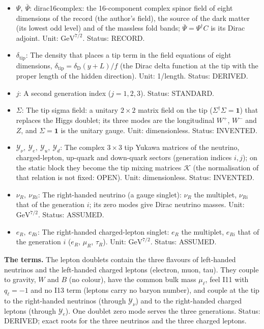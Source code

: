 \documentclass[
  10pt,
]{article}
\begin{document}
\begin{itemize}
  \(\psi\) (\(q_Q = q_{u_R} = q_{d_R} = \frac13\),
  \(q_\ell = q_{e_R} = q_{\nu_R} = -1\)), \(q_f\) of the fermion
  component \(f\). Unit: dimensionless. Status: STANDARD.
\item
  \(\Psi,\ \bar\Psi\): dirac16complex: the 16-component complex spinor
  field of eight dimensions of the record (the author's field), the
  source of the dark matter (its lowest odd level) and of the massless
  fold bands; \(\bar\Psi = \Psi^\dagger C\) is its Dirac adjoint. Unit:
  \(\mathrm{GeV}^{7/2}\). Status: RECORD.
\item
  \(\delta_{\mathrm{tip}}\): The density that places a tip term in the
  field equations of eight dimensions,
  \(\delta_{\mathrm{tip}} = \delta_{\mathrm{D}}(y + L)/f\) (the Dirac
  delta function at the tip with the proper length of the hidden
  direction). Unit: 1/length. Status: DERIVED.
\item
  \(j\): A second generation index (\(j = 1, 2, 3\)). Status: STANDARD.
\item
  \(\Sigma\): The tip sigma field: a unitary \(2 \times 2\) matrix field
  on the tip (\(\Sigma^\dagger\Sigma = \mathbf{1}\)) that replaces the
  Higgs doublet; its three modes are the longitudinal \(W^+\), \(W^-\)
  and \(Z\), and \(\Sigma = \mathbf{1}\) is the unitary gauge. Unit:
  dimensionless. Status: INVENTED.
\item
  \(\mathcal{Y}_\nu,\ \mathcal{Y}_e,\ \mathcal{Y}_u,\ \mathcal{Y}_d\):
  The complex \(3 \times 3\) tip Yukawa matrices of the neutrino,
  charged-lepton, up-quark and down-quark sectors (generation indices
  \(i, j\)); on the static block they become the tip mixing matrices
  \(\mathcal{K}\) (the normalisation of that relation is not fixed:
  OPEN). Unit: dimensionless. Status: INVENTED.
\item
  \(\nu_R,\ \nu_{Ri}\): The right-handed neutrino (a gauge singlet):
  \(\nu_R\) the multiplet, \(\nu_{Ri}\) that of the generation \(i\);
  its zero modes give Dirac neutrino masses. Unit:
  \(\mathrm{GeV}^{7/2}\). Status: ASSUMED.
\item
  \(e_R,\ e_{Ri}\): The right-handed charged-lepton singlet: \(e_R\) the
  multiplet, \(e_{Ri}\) that of the generation \(i\) (\(e_R\),
  \(\mu_R\), \(\tau_R\)). Unit: \(\mathrm{GeV}^{7/2}\). Status: ASSUMED.
\end{itemize}

\textbf{The terms.} The lepton doublets contain the three flavours of
left-handed neutrinos and the left-handed charged leptons (electron,
muon, tau). They couple to gravity, \(W\) and \(B\) (no colour), have
the common bulk mass \(\mu_\ell\), feel I11 with \(q_\ell = -1\) and no
I13 term (leptons carry no baryon number), and couple at the tip to the
right-handed neutrinos (through \(\mathcal{Y}_\nu\)) and to the
right-handed charged leptons (through \(\mathcal{Y}_e\)). One doublet
zero mode serves the three generations. Status: DERIVED; exact roots for
the three neutrinos and the three charged leptons.
\end{document}
